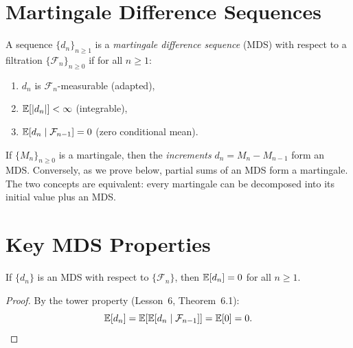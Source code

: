 \documentclass[11pt,a4paper]{article}
\begin{document}

\section{Martingale Difference Sequences}
\label{sec:mds}

\begin{definition}
\label{def:mds}
A sequence $\{d_n\}_{n \geq 1}$ is a \emph{martingale
difference sequence} (MDS) with respect to a filtration
$\{\mathcal{F}_n\}_{n \geq 0}$ if for all $n \geq 1$:
\begin{enumerate}[nosep,label=(\roman*)]
  \item $d_n$ is $\mathcal{F}_n$-measurable (adapted),
  \item $\mathbb{E}[|d_n|] < \infty$ (integrable),
  \item $\mathbb{E}[d_n \mid \mathcal{F}_{n-1}] = 0$
    (zero conditional mean).
\end{enumerate}
\end{definition}

\begin{remark}
If $\{M_n\}_{n \geq 0}$ is a martingale, then the
\emph{increments} $d_n = M_n - M_{n-1}$ form an MDS.
Conversely, as we prove below, partial sums of an MDS form a
martingale.  The two concepts are equivalent: every martingale
can be decomposed into its initial value plus an MDS.
\end{remark}


\section{Key MDS Properties}
\label{sec:mds_properties}

\begin{theorem}
\label{thm:mds_zero_mean}
If $\{d_n\}$ is an MDS with respect to $\{\mathcal{F}_n\}$,
then $\mathbb{E}[d_n] = 0$ for all $n \geq 1$.
\end{theorem}

\begin{proof}
By the tower property (Lesson~6, Theorem~6.1):
\begin{equation}
  \mathbb{E}[d_n] = \mathbb{E}\!\left[\mathbb{E}[d_n \mid \mathcal{F}_{n-1}]\right]
  = \mathbb{E}[0] = 0. \qedhere
  \label{eq:mds_zero_proof}
\end{equation}
\end{proof}
\end{document}
